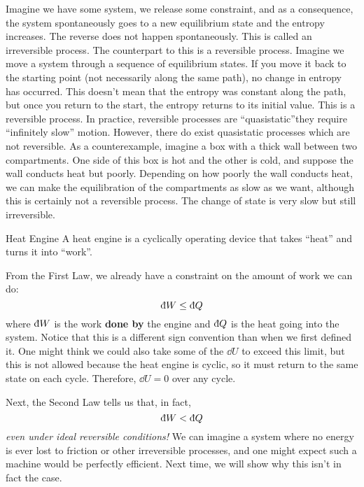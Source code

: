 \documentclass[a4paper,twoside,master.tex]{subfiles}
\begin{document}
Imagine we have some system, we release some constraint, and as a consequence, the system spontaneously goes to a new equilibrium state and the entropy increases. The reverse does not happen spontaneously. This is called an irreversible process. The counterpart to this is a reversible process. Imagine we move a system through a sequence of equilibrium states. If you move it back to the starting point (not necessarily along the same path), no change in entropy has occurred. This doesn't mean that the entropy was constant along the path, but once you return to the start, the entropy returns to its initial value. This is a reversible process. In practice, reversible processes are ``quasistatic''\textemdash they require ``infinitely slow'' motion. However, there do exist quasistatic processes which are not reversible. As a counterexample, imagine a box with a thick wall between two compartments. One side of this box is hot and the other is cold, and suppose the wall conducts heat but poorly. Depending on how poorly the wall conducts heat, we can make the equilibration of the compartments as slow as we want, although this is certainly not a reversible process. The change of state is very slow but still irreversible.

\begin{definition}{Heat Engine}
    A heat engine is a cyclically operating device that takes ``heat'' and turns it into ``work''.
\end{definition}

From the First Law, we already have a constraint on the amount of work we can do:
\begin{equation}
    \dbar{W} \leq \dbar{Q}
\end{equation}
where $ \dbar{W} $ is the work \textbf{done by} the engine and $ \dbar{Q} $ is the heat going into the system. Notice that this is a different sign convention than when we first defined it. One might think we could also take some of the $ \dd{U} $ to exceed this limit, but this is not allowed because the heat engine is cyclic, so it must return to the same state on each cycle. Therefore, $ \dd{U} = 0 $ over any cycle.

Next, the Second Law tells us that, in fact,
\begin{equation}
    \dbar{W} < \dbar{Q}
\end{equation}
\textit{even under ideal reversible conditions!} We can imagine a system where no energy is ever lost to friction or other irreversible processes, and one might expect such a machine would be perfectly efficient. Next time, we will show why this isn't in fact the case.
\end{document}
